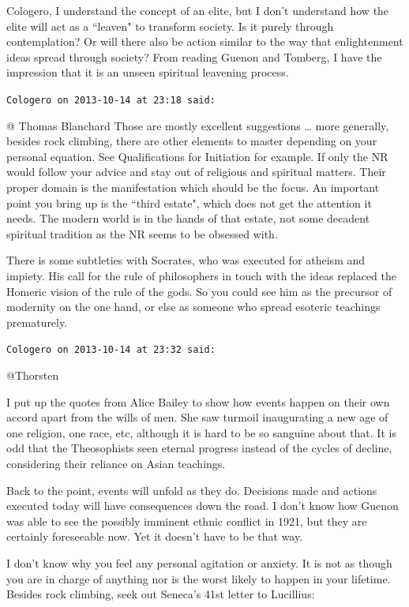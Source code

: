 \begin{footnotesize}
\begin{sffamily}
Cologero, I understand the concept of an elite, but I don't understand how the elite will act as a ``leaven" to transform society. Is it purely through contemplation? Or will there also be action similar to the way that enlightenment ideas spread through society? From reading Guenon and Tomberg, I have the impression that it is an unseen spiritual leavening process.


\hfill

\texttt{Cologero on 2013-10-14 at 23:18 said: }

@ Thomas Blanchard Those are mostly excellent suggestions … more generally, besides rock climbing, there are other elements to master depending on your personal equation. See Qualifications for Initiation for example. If only the NR would follow your advice and stay out of religious and spiritual matters. Their proper domain is the manifestation which should be the focus. An important point you bring up is the ``third estate", which does not get the attention it needs. The modern world is in the hands of that estate, not some decadent spiritual tradition as the NR seems to be obsessed with.

There is some subtleties with Socrates, who was executed for atheism and impiety. His call for the rule of philosophers in touch with the ideas replaced the Homeric vision of the rule of the gods. So you could see him as the precursor of modernity on the one hand, or else as someone who spread esoteric teachings prematurely.


\hfill

\texttt{Cologero on 2013-10-14 at 23:32 said: }

@Thorsten

I put up the quotes from Alice Bailey to show how events happen on their own accord apart from the wills of men. She saw turmoil inaugurating a new age of one religion, one race, etc, although it is hard to be so sanguine about that. It is odd that the Theosophists seen eternal progress instead of the cycles of decline, considering their reliance on Asian teachings.

Back to the point, events will unfold as they do. Decisions made and actions executed today will have consequences down the road. I don't know how Guenon was able to see the possibly imminent ethnic conflict in 1921, but they are certainly foreseeable now. Yet it doesn't have to be that way.

I don't know why you feel any personal agitation or anxiety. It is not as though you are in charge of anything nor is the worst likely to happen in your lifetime. Besides rock climbing, seek out Seneca's 41st letter to Lucillius:


\end{sffamily}
\end{footnotesize}
